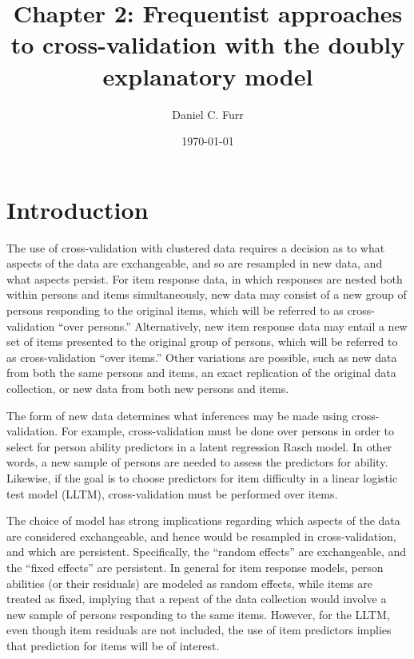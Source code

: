 \documentclass[12pt, letterpaper]{article}
\title{Chapter 2: Frequentist approaches to cross-validation with the	doubly explanatory model}
\author{Daniel C. Furr}
\date{\today}
\begin{document}

\newcommand{\comment}[1]{{\footnotesize[\textit{#1}]}}

\maketitle

\tableofcontents


\section{Introduction}

The use of cross-validation with clustered data requires a decision as to what aspects of the data are exchangeable, and so are resampled in new data, and what aspects persist. For item response data, in which responses are nested both within persons and items simultaneously, new data may consist of a new group of persons responding to the original items, which will be referred to as cross-validation ``over persons.'' Alternatively, new item response data may entail a new set of items presented to the original group of persons, which will be referred to as cross-validation ``over items.'' Other variations are possible, such as new data from both the same persons and items, an exact replication of the original data collection, or new data from both new persons and items.

The form of new data determines what inferences may be made using cross-validation. For example, cross-validation must be done over persons in order to select for person ability predictors in a latent regression Rasch model. In other words, a new sample of persons are needed to assess the predictors for ability. Likewise, if the goal is to choose predictors for item difficulty in a linear logistic test model (LLTM), cross-validation must be performed over items.

The choice of model has strong implications regarding which aspects of the data are considered exchangeable, and hence would be resampled in cross-validation, and which are persistent. Specifically, the ``random effects'' are exchangeable, and the ``fixed effects'' are persistent. In general for item response models, person abilities (or their residuals) are modeled as random effects, while items are treated as fixed, implying that a repeat of the data collection would involve a new sample of persons responding to the same items. However, for the LLTM, even though item residuals are not included, the use of item predictors implies that prediction for items will be of interest.
\end{document}
